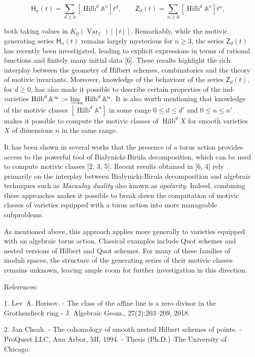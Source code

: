 $$
\mathsf{H}_n(t) =\sum_{d\geq
0}[\operatorname{Hilb}^d\mathbb{A}^n]t^d,
\qquad \mathsf{Z}_d(t) =\sum_{n\geq
0}[\operatorname{Hilb}^d\mathbb{A}^n]t^n,
$$

both taking values in
$K_0(\operatorname{Var}_{\mathbb{C}})[\![
t]\!]$. Remarkably, while the motivic
generating series $\mathsf{H}_n(t)$ remains
largely mysterious for $n\ge 3$, the series
$\mathsf{Z}_d(t)$ has recently been
investigated, leading to explicit expressions
in terms of rational functions and finitely
many initial data [6]. These results
highlight the rich interplay between the
geometry of Hilbert schemes, combinatorics
and the theory of motivic invariants.
Moreover, knowledge of the behaviour of the
series $\mathsf{Z}_d(t)$, for $d\geq 0$, has
also made it possible to describe certain
properties of the ind-varieties
$\operatorname{Hilb}^d\mathbb{A}^{\infty}
:=\varinjlim_{n}\operatorname{Hilb}^d
\mathbb{A} ^n.$ It is also worth mentioning
that knowledge of the motivic classes
$[\operatorname{Hilb}^d\mathbb{A}^n]$ in some
range $0\le d\le d'$ and $0\le n\le n'$ makes
it possible to compute the motivic classes of
$\operatorname{Hilb}^d X$ for smooth
varieties $X$ of dimensions $n$ in the same
range.

It has been shown in several works that the
presence of a torus action provides access to
the powerful tool of Bia{\l}ynicki-Birula
decomposition, which can be used to compute
motivic classes [2, 3, 5]. Recent results
obtained in [6, 4] rely primarily on the
interplay between Bia{\l}ynicki-Birula
decomposition and algebraic techniques such
as \textit{Macaulay duality} also known as
\textit{apolarity}. Indeed, combining these
approaches makes it possible to break down
the computation of motivic classes of
varieties equipped with a torus action into
more manageable subproblems.

As mentioned above, this approach applies
more generally to varieties equipped with an
algebraic torus action. Classical examples
include Quot schemes and nested versions of
Hilbert and Quot schemes. For many of these
families of moduli spaces, the structure of
the generating series of their motivic
classes remains unknown, leaving ample room
for further investigation in this direction.

References:

1. Lev~A. Borisov. - The class of the affine
line is a zero divisor in the {G}rothendieck
ring - J. Algebraic Geom., 27(2):203--209,
2018.

2. Jan Cheah. - The cohomology of smooth
nested {H}ilbert schemes of points. -
ProQuest LLC, Ann Arbor, MI, 1994. - Thesis
(Ph.D.)--The University of Chicago.

